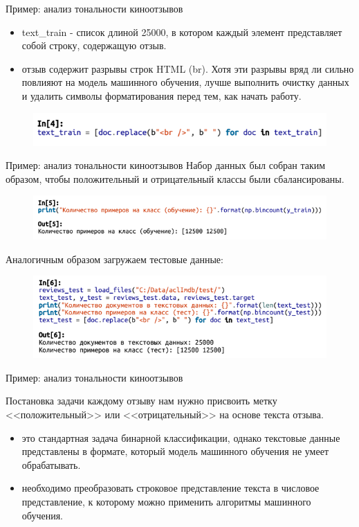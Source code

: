 \documentclass{beamer}
\begin{document}
\begin{frame}{Пример: анализ тональности киноотзывов}
\begin{itemize}
\item text\_train - список длиной 25000, в котором каждый элемент представляет собой строку, содержащую отзыв.
\item отзыв содержит разрывы строк HTML (br). Хотя эти разрывы вряд ли сильно повлияют на модель машинного обучения, лучше выполнить очистку данных и удалить символы форматирования перед тем, как начать работу.
\end{itemize}
\begin{figure}[h]
\centering
\includegraphics[scale=0.75]{images/lec09-pic03.png}
\end{figure}
\end{frame}

\begin{frame}{Пример: анализ тональности киноотзывов}
Набор данных был собран таким образом, чтобы положительный и отрицательный классы были сбалансированы.
\begin{figure}[h]
\centering
\includegraphics[scale=0.6]{images/lec09-pic04.png}
\end{figure}
Аналогичным образом загружаем тестовые данные:
\begin{figure}[h]
\centering
\includegraphics[scale=0.6]{images/lec09-pic05.png}
\end{figure}
\end{frame}

\begin{frame}{Пример: анализ тональности киноотзывов}
\begin{block}{Постановка задачи}
каждому отзыву нам нужно присвоить метку <<положительный>> или <<отрицательный>> на основе текста отзыва.
\end{block}
\begin{itemize}
\item это стандартная задача бинарной классификации, однако текстовые данные представлены в формате, который модель машинного обучения не умеет обрабатывать. 
\item необходимо преобразовать строковое представление текста в числовое представление, к которому можно применить алгоритмы машинного обучения.
\end{itemize}
\end{frame}
\end{document}
